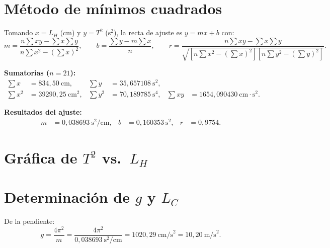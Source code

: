 \documentclass[12pt,a4paper]{article}
\begin{document}
\section{M\'etodo de m\'inimos cuadrados}
Tomando $x = L_H$ (cm) y $y = T^2$ (s$^2$), la recta de ajuste es $y = mx + b$ con:
\begin{equation}
    m = \frac{n\sum xy - \sum x \sum y}{n\sum x^2 - (\sum x)^2}, \qquad
    b = \frac{\sum y - m\sum x}{n}, \qquad
    r = \frac{n\sum xy - \sum x \sum y}{\sqrt{\left[n\sum x^2 - (\sum x)^2\right]\left[n\sum y^2 - (\sum y)^2\right]}}.
\end{equation}

\textbf{Sumatorias ($n = 21$):}
\begin{align*}
    \sum x &= 834,50\ \text{cm}, & \sum y &= 35,657108\ \text{s}^2, \\
    \sum x^2 &= 39290,25\ \text{cm}^2, & \sum y^2 &= 70,189785\ \text{s}^4, & \sum xy &= 1654,090430\ \text{cm}\cdot\text{s}^2.
\end{align*}

\textbf{Resultados del ajuste:}
\begin{align*}
    m &= 0,038693\ \text{s}^2/\text{cm}, & b &= 0,160353\ \text{s}^2, & r &= 0,9754.
\end{align*}

\section{Gr\'afica de $T^2$ vs.\ $L_H$}
\begin{center}
\end{center}

\section{Determinaci\'on de $g$ y $L_C$}
De la pendiente:
\begin{equation}
    g = \frac{4\pi^2}{m} = \frac{4\pi^2}{0,038693\ \text{s}^2/\text{cm}} = 1020,29\ \text{cm/s}^2 = 10,20\ \text{m/s}^2.
\end{equation}
\end{document}
